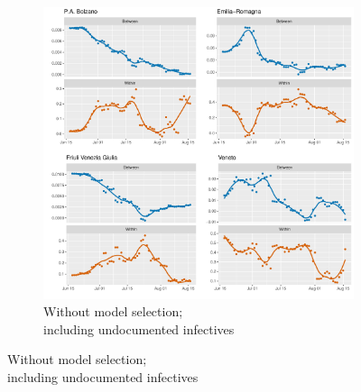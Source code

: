 \documentclass[12pt]{article}
\begin{document}
    \begin{figure}[H]\ContinuedFloat
	    \begin{subfigure}{\textwidth}
	      \centering
	      \includegraphics[width=\linewidth]{output/model_between_lag14_betas_Nord-Est_UndocQuadratic_rolling.pdf}
	      \caption{Without model selection; \\ including undocumented infectives}
	      \label{fig:beta_between_over_time_nordest_regular_undoc}
	    \end{subfigure}
    \end{figure}
\end{document}
